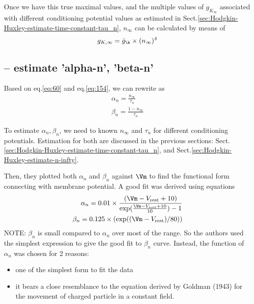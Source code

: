 Once we have this true maximal values, and the multiple values of $g_{K_\infty}$
associated with different conditioning potential values as estimated in
Sect.\ref{sec:Hodgkin-Huxley-estimate-time-constant-tau_n}, $n_\infty$ can be
calculated by means of
\begin{equation}
g_{K,\infty} = \bar{g}_{\k} \times (n_\infty)^4
\end{equation}

\subsection{-- estimate 'alpha-n', 'beta-n'}
\label{sec:Hodgkin-Huxley-estimate-alpha-n-beta-n}

Based on eq.\ref{eq:60} and eq.\ref{eq:154}, we can rewrite as
\begin{equation}
\begin{split}
\alpha_n = \frac{n_\infty}{\tau_n} \\
\beta_n = \frac{1 - n_\infty}{\tau_n} 
\end{split}
\end{equation}

To estimate $\alpha_n, \beta_n$, we need to known $n_\infty$ and $\tau_n$ for
different conditioning potentials. Estimation for both are discussed in the
previous sections:
Sect.\ref{sec:Hodgkin-Huxley-estimate-time-constant-tau_n}, and
Sect.\ref{sec:Hodgkin-Huxley-estimate-n-infty}. 


Then, they plotted both $\alpha_n$ and $\beta_n$ against $\Vm$ to find the
functional form connecting with membrane potential. A good fit was derived using
equations
\begin{equation}
\begin{split}
\alpha_n = 0.01 \times \frac{(\Vm - V_\rest + 10)}{\exp (\frac{\Vm - V_\rest +
10}{10}) - 1}
\\
\beta_n = 0.125 \times (\exp((\Vm - V_\rest) / 80)) 
\end{split}
\end{equation}
NOTE: $\beta_n$ is small compared to $\alpha_n$ over most of the range. So the
authors used the simplest expression to give the good fit to $\beta_n$ curve.
Instead, the function of $\alpha_n$ was chosen for 2 reasons: 
\begin{itemize}
  \item one of the simplest form to fit the data
  \item it bears a close resemblance to the equation derived by Goldman (1943)
  for the movement of charged particle in a constant field.
  
\end{itemize}

